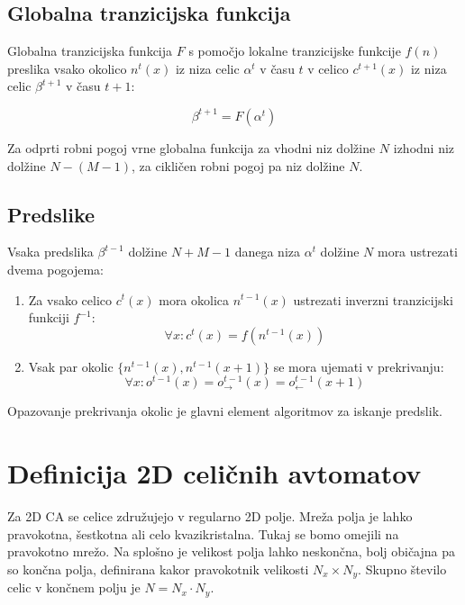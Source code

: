 \documentclass[12pt,a4paper,openany,twoside]{book}
\begin{document}
\subsection{Globalna tranzicijska funkcija}

Globalna tranzicijska funkcija \(F\) s pomočjo lokalne tranzicijske funkcije \(f(n)\)
preslika vsako okolico \(n^t(x)\) iz niza celic \(\alpha^t\) v času \(t\)
v celico \(c^{t+1}(x)\) iz niza celic \(\beta^{t+1}\) v času \(t+1\):

\begin{equation}
\beta^{t+1} = F (\alpha^t)
\end{equation}

Za odprti robni pogoj vrne globalna funkcija za vhodni niz dolžine \(N\)
izhodni niz dolžine \(N-(M-1)\), za cikličen robni pogoj pa niz dolžine \(N\).

\subsection{Predslike}

Vsaka predslika \(\beta^{t-1}\) dolžine \(N+M-1\) danega niza \(\alpha^t\) dolžine \(N\) mora ustrezati dvema pogojema:
\begin{enumerate}
\item Za vsako celico \(c^{t}(x)\) mora okolica \(n^{t-1}(x)\) ustrezati inverzni tranzicijski funkciji \(f^{-1}\):
\begin{equation}
\forall x : c^{t}(x) = f(n^{t-1}(x))
\end{equation}
\item Vsak par okolic \(\{n^{t-1}(x), n^{t-1}(x+1)\}\) se mora ujemati v prekrivanju:
\begin{equation}
\forall x : o^{t-1}(x) = o_{\rightarrow}^{t-1}(x) = o_{\leftarrow}^{t-1}(x+1)
\end{equation}
\end{enumerate}
Opazovanje prekrivanja okolic je glavni element algoritmov za iskanje predslik.

\section{Definicija 2D celičnih avtomatov}

Za 2D CA se celice združujejo v regularno 2D polje.
Mreža polja je lahko pravokotna, šestkotna ali celo kvazikristalna.
Tukaj se bomo omejili na pravokotno mrežo.
Na splošno je velikost polja lahko neskončna,
bolj običajna pa so končna polja,
definirana kakor pravokotnik velikosti \(N_x \times N_y\).
Skupno število celic v končnem polju je \(N=N_x \cdot N_y\).
\end{document}
